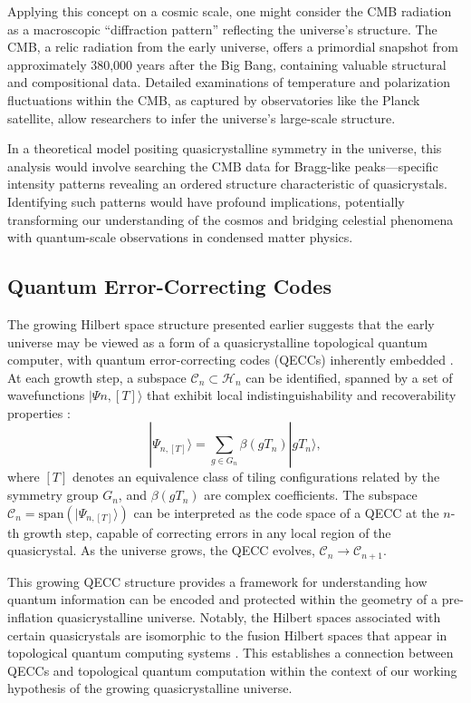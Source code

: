 \documentclass[sn-mathphys-num]{sn-jnl}%
\begin{document}
Applying this concept on a cosmic scale, one might consider the CMB radiation as a macroscopic ``diffraction pattern'' reflecting the universe's structure. The CMB, a relic radiation from the early universe, offers a primordial snapshot from approximately 380,000 years after the Big Bang, containing valuable structural and compositional data. Detailed examinations of temperature and polarization fluctuations within the CMB, as captured by observatories like the Planck satellite, allow researchers to infer the universe's large-scale structure.

In a theoretical model positing quasicrystalline symmetry in the universe, this analysis would involve searching the CMB data for Bragg-like peaks—specific intensity patterns revealing an ordered structure characteristic of quasicrystals. Identifying such patterns would have profound implications, potentially transforming our understanding of the cosmos and bridging celestial phenomena with quantum-scale observations in condensed matter physics.

\subsection{Quantum Error-Correcting Codes}
The growing Hilbert space structure presented earlier suggests that the early universe may be viewed as a form of a quasicrystalline topological quantum computer, with quantum error-correcting codes (QECCs) inherently embedded \cite{Li:2023nkr}. At each growth step, a subspace $\mathcal{C}_n \subset \mathcal{H}_n$ can be identified, spanned by a set of wavefunctions ${|\Psi{n,[T]}\rangle}$ that exhibit local indistinguishability and recoverability properties \cite{Li:2023nkr}:
\begin{equation}
|\Psi_{n,[T]}\rangle = \sum_{g \in G_n} \beta(g T_n) |g T_n\rangle,
\end{equation}
where $[T]$ denotes an equivalence class of tiling configurations related by the symmetry group $G_n$, and $\beta(g T_n)$ are complex coefficients. The subspace $\mathcal{C}_n = \text{span}({|\Psi_{n,[T]}\rangle})$ can be interpreted as the code space of a QECC at the $n$-th growth step, capable of correcting errors in any local region of the quasicrystal. As the universe grows, the QECC evolves, $\mathcal{C}_n \rightarrow \mathcal{C}_{n+1}$.

This growing QECC structure provides a framework for understanding how quantum information can be encoded and protected within the geometry of a pre-inflation quasicrystalline universe. Notably, the Hilbert spaces associated with certain quasicrystals are isomorphic to the fusion Hilbert spaces that appear in topological quantum computing systems \cite{Amaral2022sy}. This establishes a connection between QECCs and topological quantum computation within the context of our working hypothesis of the growing quasicrystalline universe.
\end{document}
